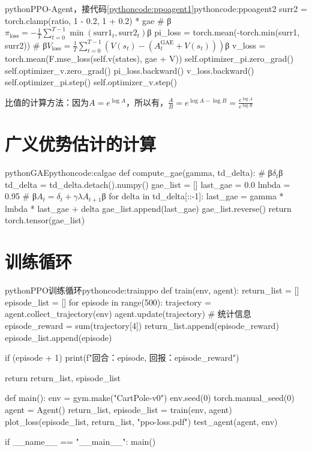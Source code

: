 \documentclass[lang=cn,newtx,10pt,scheme=chinese]{elegantbook}
\begin{document}
\begin{codebox}{python}{PPO-Agent，接代码\ref{pythoncode:ppoagent1}}{pythoncode:ppoagent2}
            surr2 = torch.clamp(ratio, 1 - 0.2, 1 + 0.2) * gae
            # β$\pi_\text{loss}=-\frac{1}{T}\displaystyle\sum_{t=0}^{T-1}\min(\text{surr1}_t,\text{surr2}_t)$β
            pi_loss = torch.mean(-torch.min(surr1, surr2))
            # β$V_{\text{loss}}=\frac{1}{T}\displaystyle\sum_{t=0}^{T-1}\left(V(s_t)-\left(A_t^{\text{GAE}}+V(s_t)\right)\right)$β
            v_loss = torch.mean(F.mse_loss(self.v(states), gae + V))
            self.optimizer_pi.zero_grad()
            self.optimizer_v.zero_grad()
            pi_loss.backward()
            v_loss.backward()
            self.optimizer_pi.step()
            self.optimizer_v.step()
\end{codebox}

\begin{marker}
比值的计算方法：因为$A=e^{\log{A}}$，所以有，$\frac{A}{B}=e^{\log{A}-\log{B}}=\frac{e^{\log{A}}}{e^{\log{B}}}$
\end{marker}

\section{广义优势估计的计算}

\begin{codebox}{python}{GAE}{pythoncode:calgae}
def compute_gae(gamma, td_delta):
    # β$\delta_t$β
    td_delta = td_delta.detach().numpy()
    gae_list = []
    last_gae = 0.0
    lmbda = 0.95
    # β$A_t=\delta_t+\gamma\lambda A_{t+1}$β
    for delta in td_delta[::-1]:
        last_gae = gamma * lmbda * last_gae + delta
        gae_list.append(last_gae)
    gae_list.reverse()
    return torch.tensor(gae_list)
\end{codebox}

\section{训练循环}

\begin{codebox}{python}{PPO训练循环}{pythoncode:trainppo}
def train(env, agent):
    return_list = []
    episode_list = []
    for episode in range(500):
        trajectory = agent.collect_trajectory(env)
        agent.update(trajectory)
        # 统计信息
        episode_reward = sum(trajectory[4])
        return_list.append(episode_reward)
        episode_list.append(episode)

        if (episode + 1) %
            print(f"回合：{episode}, 回报：{episode_reward}")

    return return_list, episode_list

def main():
    env = gym.make("CartPole-v0")
    env.seed(0)
    torch.manual_seed(0)
    agent = Agent()
    return_list, episode_list = train(env, agent)
    plot_loss(episode_list, return_list, "ppo-loss.pdf")
    test_agent(agent, env)

if __name__ == "__main__":
    main()
\end{codebox}
\end{document}
